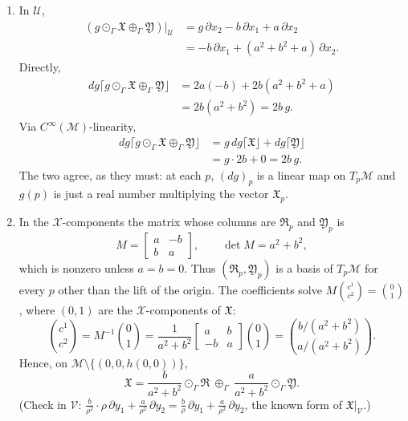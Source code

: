 \documentclass[11pt]{article}
\begin{document}
\begin{enumerate}[label=(\alph*)]
\item In $\mathcal U$,
\begin{align*}
(g\odot_\Gamma\mathfrak X\oplus_\Gamma\mathfrak Y)|_{\mathcal U}&=g\,\partial x_2-b\,\partial x_1+a\,\partial x_2\\
&=-b\,\partial x_1+(a^2+b^2+a)\,\partial x_2.
\end{align*}
Directly,
\begin{align*}
dg\lceil g\odot_\Gamma\mathfrak X\oplus_\Gamma\mathfrak Y\rfloor&=2a(-b)+2b(a^2+b^2+a)\\
&=2b(a^2+b^2)=2b\,g.
\end{align*}
Via $C^\infty(\mathcal M)$-linearity,
\begin{align*}
dg\lceil g\odot_\Gamma\mathfrak X\oplus_\Gamma\mathfrak Y\rfloor&=g\,dg\lceil\mathfrak X\rfloor+dg\lceil\mathfrak Y\rfloor\\
&=g\cdot2b+0=2b\,g.
\end{align*}
The two agree, as they must: at each $p$, $(dg)_p$ is a linear map on $T_p\mathcal M$ and $g(p)$ is just a real number multiplying the vector $\mathfrak X_p$.
\item In the $\mathcal X$-components the matrix whose columns are $\mathfrak R_p$ and $\mathfrak Y_p$ is
\[
M=\begin{bmatrix}a&-b\\b&a\end{bmatrix},\qquad\det M=a^2+b^2,
\]
which is nonzero unless $a=b=0$. Thus $(\mathfrak R_p,\mathfrak Y_p)$ is a basis of $T_p\mathcal M$ for every $p$ other than the lift of the origin.
The coefficients solve $M\binom{c^1}{c^2}=\binom01$, where $(0,1)$ are the $\mathcal X$-components of $\mathfrak X$:
\[
\binom{c^1}{c^2}=M^{-1}\binom01=\frac1{a^2+b^2}\begin{bmatrix}a&b\\-b&a\end{bmatrix}\binom01=\binom{b/(a^2+b^2)}{a/(a^2+b^2)}.
\]
Hence, on $\mathcal M\setminus\{(0,0,h(0,0))\}$,
\[
\mathfrak X=\frac{b}{a^2+b^2}\odot_\Gamma\mathfrak R\ \oplus_\Gamma\ \frac a{a^2+b^2}\odot_\Gamma\mathfrak Y.
\]
(Check in $\mathcal V$: $\frac b{\rho^2}\cdot\rho\,\partial y_1+\frac a{\rho^2}\,\partial y_2=\frac b\rho\,\partial y_1+\frac a{\rho^2}\,\partial y_2$, the known form of $\mathfrak X|_{\mathcal V}$.)


\end{enumerate}
\end{document}
